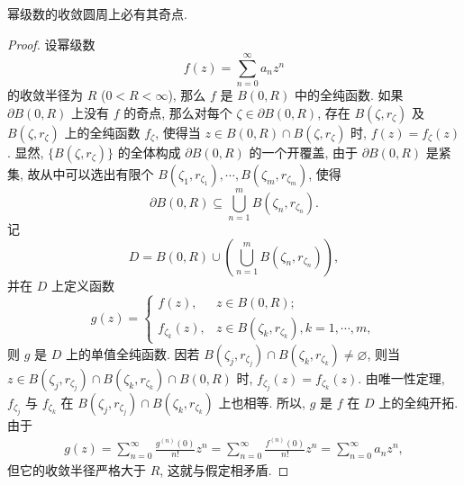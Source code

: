 \documentclass[../../main.tex]{subfiles}%
\begin{document}
\begin{theorem}
幂级数的收敛圆周上必有其奇点.
\end{theorem}
\begin{proof}
设幂级数
\[
f(z)=\sum_{n=0}^{\infty} a_n z^n
\]
的收敛半径为 \(R\) (\(0<R<\infty\)), 那么 \(f\) 是 \(B(0,R)\) 中的全纯函数. 如果 \(\partial B(0,R)\) 上没有 \(f\) 的奇点, 那么对每个 \(\zeta \in \partial B(0,R)\), 存在 \(B(\zeta,r_\zeta)\) 及 \(B(\zeta,r_\zeta)\) 上的全纯函数 \(f_\zeta\), 使得当 \(z \in B(0,R) \cap B(\zeta,r_\zeta)\) 时, \(f(z)=f_\zeta(z)\). 显然, \(\{B(\zeta,r_\zeta)\}\) 的全体构成 \(\partial B(0,R)\) 的一个开覆盖, 由于 \(\partial B(0,R)\) 是紧集, 故从中可以选出有限个 \(B(\zeta_1,r_{\zeta_1}),\cdots,B(\zeta_m,r_{\zeta_m})\),
使得
\[
\partial B(0,R) \subseteq \bigcup\limits_{n=1}^{m} B(\zeta_n,r_{\zeta_n}).
\]
记
\[
D = B(0,R) \cup \left( \bigcup\limits_{n=1}^{m} B(\zeta_n,r_{\zeta_n}) \right),
\]
并在 \(D\) 上定义函数
\[
g(z) = \begin{cases} f(z), & z \in B(0,R); \\ f_{\zeta_k}(z), & z \in B(\zeta_k,r_{\zeta_k}), k=1,\cdots,m, \end{cases}
\]
则 \(g\) 是 \(D\) 上的单值全纯函数. 因若 \(B(\zeta_j,r_{\zeta_j}) \cap B(\zeta_k,r_{\zeta_k}) \neq \varnothing\), 则当 \(z \in B(\zeta_j,r_{\zeta_j}) \cap B(\zeta_k,r_{\zeta_k}) \cap B(0,R)\) 时, \(f_{\zeta_j}(z) = f_{\zeta_k}(z)\). 由唯一性定理, \(f_{\zeta_j}\) 与 \(f_{\zeta_k}\) 在 \(B(\zeta_j,r_{\zeta_j}) \cap B(\zeta_k,r_{\zeta_k})\) 上也相等. 所以, \(g\) 是 \(f\) 在 \(D\) 上的全纯开拓. 由于
\begin{align*}
g(z) = \sum_{n=0}^{\infty} \frac{g^{(n)}(0)}{n!} z^n = \sum_{n=0}^{\infty} \frac{f^{(n)}(0)}{n!} z^n = \sum_{n=0}^{\infty} a_n z^n,
\end{align*}
但它的收敛半径严格大于 \(R\), 这就与假定相矛盾.
\end{proof}
\end{document}
